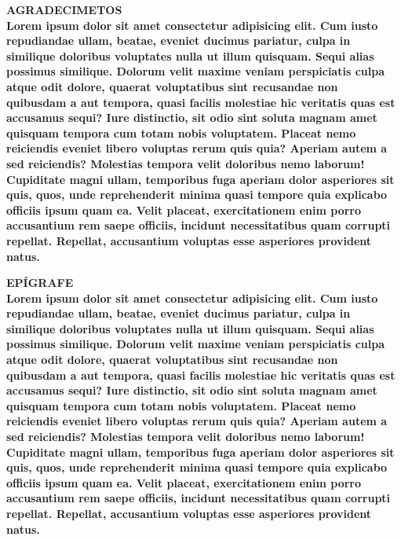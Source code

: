 \documentclass[12pt,a4paper,oneside,brazil]{abntex2}
\begin{document}
\clearpage

\centering
\ABNTEXchapterfont\bfseries{\textsc{\MakeUppercase{Agradecimetos}}}\\
\vspace*{3cm}
\justifying
\normalfont
Lorem ipsum dolor sit amet consectetur adipisicing elit. Cum iusto repudiandae ullam, beatae, eveniet ducimus pariatur, culpa in similique doloribus voluptates nulla ut illum quisquam. Sequi alias possimus similique. Dolorum velit maxime veniam perspiciatis culpa atque odit dolore, quaerat voluptatibus sint recusandae non quibusdam a aut tempora, quasi facilis molestiae hic veritatis quas est accusamus sequi? Iure distinctio, sit odio sint soluta magnam amet quisquam tempora cum totam nobis voluptatem. Placeat nemo reiciendis eveniet libero voluptas rerum quis quia? Aperiam autem a sed reiciendis? Molestias tempora velit doloribus nemo laborum! Cupiditate magni ullam, temporibus fuga aperiam dolor asperiores sit quis, quos, unde reprehenderit minima quasi tempore quia explicabo officiis ipsum quam ea. Velit placeat, exercitationem enim porro accusantium rem saepe officiis, incidunt necessitatibus quam corrupti repellat. Repellat, accusantium voluptas esse asperiores provident natus.
\clearpage

\centering
\ABNTEXchapterfont\bfseries{\textsc{\MakeUppercase{Epígrafe}}}\\
\vspace*{3cm}
\justifying
\normalfont
Lorem ipsum dolor sit amet consectetur adipisicing elit. Cum iusto repudiandae ullam, beatae, eveniet ducimus pariatur, culpa in similique doloribus voluptates nulla ut illum quisquam. Sequi alias possimus similique. Dolorum velit maxime veniam perspiciatis culpa atque odit dolore, quaerat voluptatibus sint recusandae non quibusdam a aut tempora, quasi facilis molestiae hic veritatis quas est accusamus sequi? Iure distinctio, sit odio sint soluta magnam amet quisquam tempora cum totam nobis voluptatem. Placeat nemo reiciendis eveniet libero voluptas rerum quis quia? Aperiam autem a sed reiciendis? Molestias tempora velit doloribus nemo laborum! Cupiditate magni ullam, temporibus fuga aperiam dolor asperiores sit quis, quos, unde reprehenderit minima quasi tempore quia explicabo officiis ipsum quam ea. Velit placeat, exercitationem enim porro accusantium rem saepe officiis, incidunt necessitatibus quam corrupti repellat. Repellat, accusantium voluptas esse asperiores provident natus.
\clearpage
\end{document}
